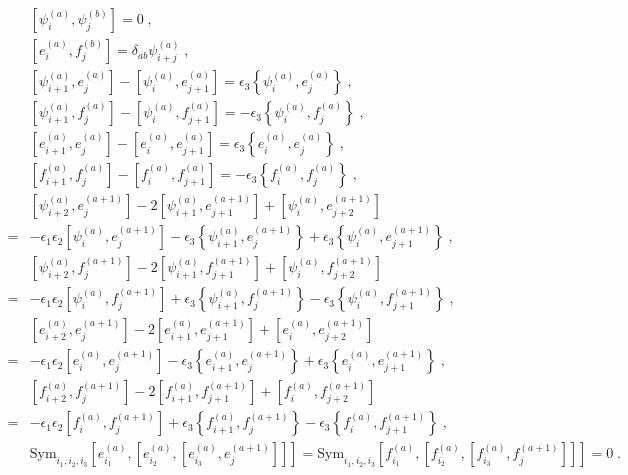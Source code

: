 \documentclass[11pt]{article}
\numberwithin{equation}{section}
\numberwithin{figure}{section}
\numberwithin{table}{section}
\begin{document}
\begin{subequations}
	\begin{align}
	&\left[\psi^{(a)}_i,\psi^{(b)}_j\right]=0\;,\\
	&\left[e^{(a)}_i,f^{(b)}_j\right]=\delta_{ab}\psi^{(a)}_{i+j}\;,\\
	&\left[\psi^{(a)}_{i+1},e^{(a)}_j\right]-\left[\psi^{(a)}_i,e^{(a)}_{j+1}\right]=\epsilon_3\left\{\psi^{(a)}_i,e^{(a)}_j\right\}\;,\\
	&\left[\psi^{(a)}_{i+1},f^{(a)}_j\right]-\left[\psi^{(a)}_i,f^{(a)}_{j+1}\right]=-\epsilon_3\left\{\psi^{(a)}_i,f^{(a)}_j\right\}\;,\\
	&\left[e^{(a)}_{i+1},e^{(a)}_j\right]-\left[e^{(a)}_i,e^{(a)}_{j+1}\right]=\epsilon_3\left\{e^{(a)}_i,e^{(a)}_j\right\}\;,\\
	&\left[f^{(a)}_{i+1},f^{(a)}_j\right]-\left[f^{(a)}_i,f^{(a)}_{j+1}\right]=-\epsilon_3\left\{f^{(a)}_i,f^{(a)}_j\right\}\;,\\
	&\left[\psi^{(a)}_{i+2},e^{(a+1)}_j\right]-2\left[\psi^{(a)}_{i+1},e^{(a+1)}_{j+1}\right]+\left[\psi^{(a)}_i,e^{(a+1)}_{j+2}\right]\nonumber\\
	=&-\epsilon_1\epsilon_2\left[\psi^{(a)}_i,e^{(a+1)}_j\right]-\epsilon_3\left\{\psi^{(a)}_{i+1},e^{(a+1)}_j\right\}+\epsilon_3\left\{\psi^{(a)}_i,e^{(a+1)}_{j+1}\right\}\;,\\
	&\left[\psi^{(a)}_{i+2},f^{(a+1)}_j\right]-2\left[\psi^{(a)}_{i+1},f^{(a+1)}_{j+1}\right]+\left[\psi^{(a)}_i,f^{(a+1)}_{j+2}\right]\nonumber\\
	=&-\epsilon_1\epsilon_2\left[\psi^{(a)}_i,f^{(a+1)}_j\right]+\epsilon_3\left\{\psi^{(a)}_{i+1},f^{(a+1)}_j\right\}-\epsilon_3\left\{\psi^{(a)}_i,f^{(a+1)}_{j+1}\right\}\;,\\
	&\left[e^{(a)}_{i+2},e^{(a+1)}_j\right]-2\left[e^{(a)}_{i+1},e^{(a+1)}_{j+1}\right]+\left[e^{(a)}_i,e^{(a+1)}_{j+2}\right]\nonumber\\
	=&-\epsilon_1\epsilon_2\left[e^{(a)}_i,e^{(a+1)}_j\right]-\epsilon_3\left\{e^{(a)}_{i+1},e^{(a+1)}_j\right\}+\epsilon_3\left\{e^{(a)}_i,e^{(a+1)}_{j+1}\right\}\;,\\
	&\left[f^{(a)}_{i+2},f^{(a+1)}_j\right]-2\left[f^{(a)}_{i+1},f^{(a+1)}_{j+1}\right]+\left[f^{(a)}_i,f^{(a+1)}_{j+2}\right]\nonumber\\
	=&-\epsilon_1\epsilon_2\left[f^{(a)}_i,f^{(a+1)}_j\right]+\epsilon_3\left\{f^{(a)}_{i+1},f^{(a+1)}_j\right\}-\epsilon_3\left\{f^{(a)}_i,f^{(a+1)}_{j+1}\right\}\;,\\
	&\mathrm{Sym}_{i_1,i_2,i_3}\left[e^{(a)}_{i_1},\left[e^{(a)}_{i_2},\left[e^{(a)}_{i_3},e^{(a+1)}_j\right]\right]\right]=\mathrm{Sym}_{i_1,i_2,i_3}\left[f^{(a)}_{i_1},\left[f^{(a)}_{i_2},\left[f^{(a)}_{i_3},f^{(a+1)}_j\right]\right]\right]=0\;.
\end{align}
\end{subequations}
\end{document}
